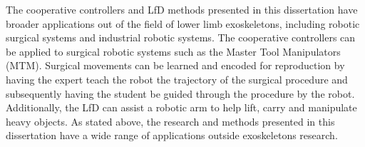 The cooperative controllers and LfD methods presented in this dissertation have broader applications out of the field of lower limb exoskeletons, including robotic surgical systems and industrial robotic systems. The cooperative controllers can be applied to surgical robotic systems such as the Master Tool Manipulators (MTM). Surgical movements can be learned and encoded for reproduction by having the expert teach the robot the trajectory of the surgical procedure and subsequently having the student be guided through the procedure by the robot. Additionally, the LfD can assist a robotic arm to help lift, carry and manipulate heavy objects. As stated above, the research and methods presented in this dissertation have a wide range of applications outside exoskeletons research.  








   
